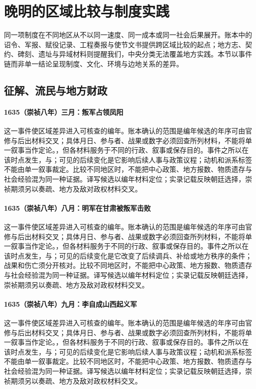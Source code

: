 \section{晚明的区域比较与制度实践}

同一项制度在不同地区从不以同一速度、同一成本或同一社会后果展开。账本中的诏令、军报、赋役记录、工程奏报与使节文书提供跨区域比较的起点；地方志、契约、碑刻、遗址与异域材料则提醒我们，中央分类无法覆盖地方实践。本节以事件链而非单一结论呈现制度、文化、环境与边地关系的差异。

\subsection{征解、流民与地方财政}

\paragraph{1635（崇祯八年）三月：叛军占领凤阳} 这一事件使区域差异进入可核查的编年。账本确认的范围是编年候选的年序可由官修与后出材料交叉；具体月日、参与者、战果或数字必须回查所列材料，不能将单一叙事当作定论。，但各材料服务于不同的行政、叙事或保存目的。事件之所以在该时点发生，与；可见的后续变化是它影响后续人事与政策议程；动机和派系标签不能由单一叙事裁定。比较不同地区时，不能把中心政策、地方报数、物质遗存与社会经验混为同一种证据。译写候选以编年材料定位；实录记载反映朝廷选择，崇祯期须另以奏疏、地方及敌对政权材料交叉。

\paragraph{1635（崇祯八年）八月：明军在甘肃被叛军击败} 这一事件使区域差异进入可核查的编年。账本确认的范围是编年候选的年序可由官修与后出材料交叉；具体月日、参与者、战果或数字必须回查所列材料，不能将单一叙事当作定论。，但各材料服务于不同的行政、叙事或保存目的。事件之所以在该时点发生，与；可见的后续变化是它改变了后续调兵、补给或地方秩序的条件；战果和伤亡须分开核对。比较不同地区时，不能把中心政策、地方报数、物质遗存与社会经验混为同一种证据。译写候选以编年材料定位；实录记载反映朝廷选择，崇祯期须另以奏疏、地方及敌对政权材料交叉。

\paragraph{1635（崇祯八年）九月：李自成山西起义军} 这一事件使区域差异进入可核查的编年。账本确认的范围是编年候选的年序可由官修与后出材料交叉；具体月日、参与者、战果或数字必须回查所列材料，不能将单一叙事当作定论。，但各材料服务于不同的行政、叙事或保存目的。事件之所以在该时点发生，与；可见的后续变化是它影响后续人事与政策议程；动机和派系标签不能由单一叙事裁定。比较不同地区时，不能把中心政策、地方报数、物质遗存与社会经验混为同一种证据。译写候选以编年材料定位；实录记载反映朝廷选择，崇祯期须另以奏疏、地方及敌对政权材料交叉。

